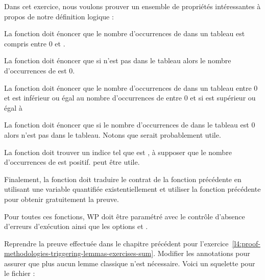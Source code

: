 



Dans cet exercice, nous voulons prouver un ensemble de propriétés intéressantes
à propos de notre définition logique  :




La fonction  doit énoncer que le nombre d'occurrences
de  dans un tableau est compris entre 0 et .


La fonction  doit énoncer que si 
n'est pas dans le tableau alors le nombre d'occurrences de  est 0.


La fonction  doit énoncer que le nombre d'occurrences
de  dans un tableau entre 0 et  est inférieur
ou égal au nombre d'occurrences de  entre 0 et  si
 est supérieur ou égal à 


La fonction  doit énoncer que si le nombre
d'occurrences de  dans le tableau est 0 alors  n'est
pas dans le tableau. Notons que  serait probablement
utile.


La fonction  doit trouver un indice 
tel que  est , à supposer que le nombre
d'occurrences de  est positif.  peut
être utile.


Finalement, la fonction  doit traduire le contrat
de la fonction précédente en utilisant une variable quantifiée existentiellement
et utiliser la fonction précédente pour obtenir gratuitement la preuve.


Pour toutes ces fonctions, WP doit être paramétré avec le contrôle d'absence
d'erreurs d'exécution ainsi que les options 
et .






Reprendre la preuve effectuée dans le chapitre précédent pour
l'exercice~\ref{l4:proof-methodologies-triggering-lemmas-exercises-sum}. Modifier
les annotations pour assurer que plus aucun lemme classique n'est nécessaire.
Voici un squelette pour le fichier :




